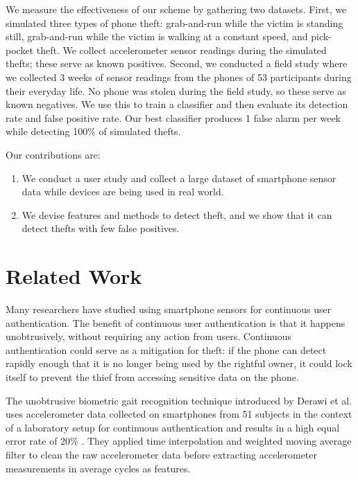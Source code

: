 \documentclass{soups}
\begin{document}
We measure the effectiveness of our scheme by gathering two datasets.
First, we simulated three types of phone theft: grab-and-run while the victim is standing still, grab-and-run while the victim is walking at a constant speed, and pick-pocket theft.
We collect accelerometer sensor readings during the simulated thefts; these serve as known positives.
Second, we conducted a field study where we collected 3 weeks of sensor readings from the phones of 53 participants during their everyday life.
No phone was stolen during the field study, so these serve as known negatives.
We use this to train a classifier and then evaluate its detection rate and false positive rate.
Our best classifier produces 1 false alarm per week while detecting 100\% of simulated thefts.


Our contributions are:
\begin{enumerate}
  \item We conduct a user study and collect a large dataset of smartphone sensor data while devices are being used in real world.
  \item We devise features and methods to detect theft, and we show that it can detect thefts with few false positives.
\end{enumerate}




\section{Related Work}

Many researchers have studied using smartphone sensors for continuous user authentication.
The benefit of continuous user authentication is that it happens unobtrusively, without requiring any action from users.
Continuous authentication could serve as a mitigation for theft: if the phone can detect rapidly enough that it is no longer being used by the rightful owner, it could lock itself to prevent the thief from accessing sensitive data on the phone.

The unobtrusive biometric gait recognition technique introduced by Derawi et al. uses accelerometer data collected on smartphones from 51 subjects in the context of a laboratory setup for continuous authentication and results in a high equal error rate of 20\% \cite{derawi:gait}. 
They applied time interpolation and weighted moving average filter to clean the raw accelerometer data before extracting accelerometer measurements in average cycles as features.
\end{document}
